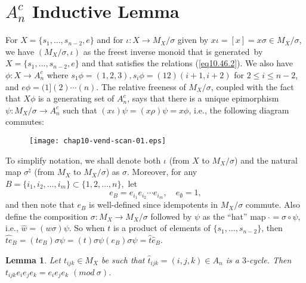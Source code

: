 \documentclass{surv-l}
\numberwithin{equation}{section}
\numberwithin{table}{section}
\numberwithin{figure}{section}
\newtheorem{lemma}[equation]{Lemma}
\theoremstyle{definition}
\begin{document}
\section{$A_{n}^{c}$ Inductive Lemma}\label{sec10.48}

For $X=\{s_{1},\ldots, s_{n-2}, e\}$ and for $\iota : X\rightarrow
M_{X}/\sigma$ given by $ x\iota =[x]=x\sigma\in M_{X}/\sigma$, we
have $(M_{X}/\sigma, \iota)$ as the freest inverse monoid that is
generated~by $X=\{s_{1},\ldots, s_{n-2}, e\}$ and that satisfies
the relations (\ref{eq10.46.2}). We also have $\phi : X\rightarrow
A_{n}^{c}$ where $s_{1}\phi=(1,2,3), s_{i}\phi=(12)(i+1, i+2)$ for
$2\leq i\leq n -2$, and $e\phi =(1](2)\cdots(n)$. The relative
freeness of $M_{X}/\sigma$, coupled with the fact that $X\phi$
is a generating set of $A_{n}^{c}$, says that there is a unique
epimorphism $\psi : M_{X}/\sigma\rightarrow A_{n}^{c}$ such that
$(x\iota)\psi=(x\rho)\psi=x\phi$, i.e., the following diagram
commutes:
\begin{figure}[!h]
\texttt{[image: chap10-vend-scan-01.eps]}
\end{figure}

\noindent To simplify notation, we shall denote both $\iota$ (from $X$
to $M_{X}/\sigma$) and the natural map $\sigma^{\natural}$
(from $M_{X}$ to $M_{X}/\sigma$) as $\sigma$. Moreover, for
any $B=\{i_{1}, i_{2},\ldots, i_{m}\} \subset\{1,2,\ldots,
n\}$,~let
\[
e_{B}=e_{i_{1}}e_{i_{2}}\cdots e_{i_{m}},\quad e_{\emptyset}=1,
\]
and then note that $e_{B}$ is well-defined since idempotents in
$M_{X}/\sigma$ commute. Also define the composition $\sigma :
M_{X}\rightarrow M_{X}/\sigma$ followed by $\psi$ as the ``hat''
map $\ \widehat{} =\sigma\circ\psi$, i.e.,
$\widehat{w}=(w\sigma)\psi$. So when $t$ is a product of elements
of $\{s_{1},\ldots, s_{n-2}\}$, then
$\widehat{te}_{B}=(te_{B})\sigma\psi=(t)\sigma\psi(e_{B})\sigma\psi=\widehat{t}\widehat{e}_{B}$.

\begin{lemma}\label{lem10.48.1}
Let $t_{ijk}\in M_{X}$ be such that $\widehat{t}_{ijk}=(i, j,
k)\in A_{n}$ is a $3$-cycle. Then $t_{ijk}e_{i}e_{j}e_{k}
=e_{i}e_{j}e_{k}$ $(mod\ \sigma)$.
\end{lemma}
\end{document}
